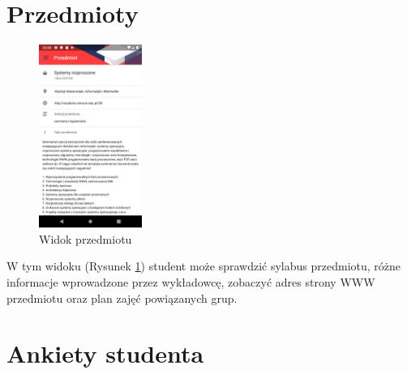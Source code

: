 \documentclass{pracamgr}
\begin{document}
\section{Przedmioty}

\begin{figure}[p]
	\centering
	\includegraphics[width=0.3\textwidth]{img/course.png}
	\caption{Widok przedmiotu}\label{fig:course}
	\medskip
\end{figure}

W tym widoku (Rysunek \ref{fig:course}) student może sprawdzić sylabus przedmiotu, różne informacje wprowadzone
przez wykładowcę, zobaczyć adres strony WWW przedmiotu oraz plan zajęć powiązanych grup.

\clearpage

\section{Ankiety studenta}
\end{document}
